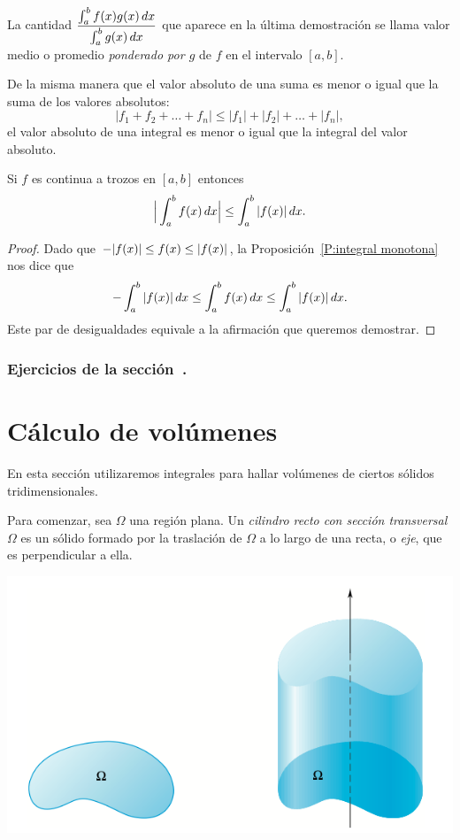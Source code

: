 \begin{remark}
  La cantidad $\displaystyle\frac{\int_a^b f(x)g(x)\,dx}{\int_a^b g(x)\,dx}$ que aparece en la última demostración se llama valor medio o promedio \emph{ponderado por $g$} de $f$ en el intervalo $[a,b]$.
\end{remark}

De la misma manera que el valor absoluto de una suma es menor o igual que la suma de los valores absolutos:
\[
|f_1+f_2+\dots+f_n| \le |f_1|+|f_2|+\dots+|f_n| ,
\]
el valor absoluto de una integral es menor o igual que la integral del valor absoluto.

\begin{corollary}
  Si $f$ es continua a trozos en $[a,b]$ entonces
  \[
  \Big| \int_a^b f(x)\,dx \Big| \le \int_a^b |f(x)|\,dx.
  \]
\end{corollary}

\begin{proof}
  Dado que $\displaystyle -|f(x)|\le f(x)\le |f(x)|$, la Proposición~\ref{P:integral monotona} nos dice que
  \[
    -\int_a^b |f(x)|\,dx 
    \le \int_a^b f(x)\,dx 
    \le \int_a^b |f(x)|\,dx .
  \]
  Este par de desigualdades equivale a la afirmación que queremos demostrar.
\end{proof}


\subsubsection*{Ejercicios de la sección~.}

\begin{enumerate}
  
\end{enumerate}


  
\section{Cálculo de volúmenes}

En esta sección utilizaremos integrales para hallar volúmenes de ciertos sólidos tridimensionales.

Para comenzar, sea $\Omega$ una región plana.
Un \emph{cilindro recto con sección transversal $\Omega$} es un sólido formado por la traslación de $\Omega$ a lo largo de una recta, o \emph{eje}, que es perpendicular a ella.

\begin{center}
  \includegraphics[width=.6\textwidth]{pics/cilindro.png}
\end{center}

